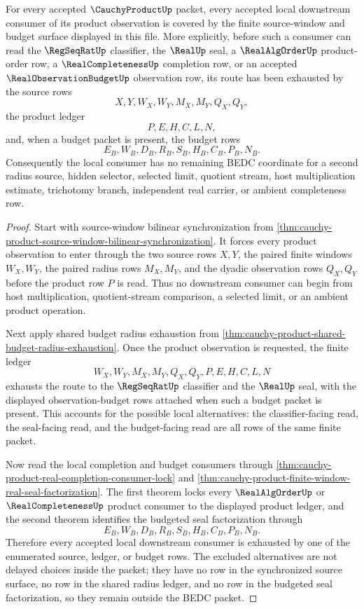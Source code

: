 \begin{theorem}
\label{thm:cauchy-product-source-window-downstream-coverage}
For every accepted $\CauchyProductUp$ packet, every accepted local downstream consumer of its product observation is covered by the finite source-window and budget surface displayed in this file. More explicitly, before such a consumer can read the $\RegSeqRatUp$ classifier, the $\RealUp$ seal, a $\RealAlgOrderUp$ product-order row, a $\RealCompletenessUp$ completion row, or an accepted $\RealObservationBudgetUp$ observation row, its route has been exhausted by the source rows
$$
X,Y,W_X,W_Y,M_X,M_Y,Q_X,Q_Y,
$$
the product ledger
$$
P,E,H,C,L,N,
$$
and, when a budget packet is present, the budget rows
$$
E_B,W_B,D_B,R_B,S_B,H_B,C_B,P_B,N_B.
$$
Consequently the local consumer has no remaining BEDC coordinate for a second radius source, hidden selector, selected limit, quotient stream, host multiplication estimate, trichotomy branch, independent real carrier, or ambient completeness row.
\end{theorem}
\begin{proof}
Start with source-window bilinear synchronization from \autoref{thm:cauchy-product-source-window-bilinear-synchronization}. It forces every product observation to enter through the two source rows $X,Y$, the paired finite windows $W_X,W_Y$, the paired radius rows $M_X,M_Y$, and the dyadic observation rows $Q_X,Q_Y$ before the product row $P$ is read. Thus no downstream consumer can begin from host multiplication, quotient-stream comparison, a selected limit, or an ambient product operation.

Next apply shared budget radius exhaustion from \autoref{thm:cauchy-product-shared-budget-radius-exhaustion}. Once the product observation is requested, the finite ledger
$$
W_X,W_Y,M_X,M_Y,Q_X,Q_Y,P,E,H,C,L,N
$$
exhausts the route to the $\RegSeqRatUp$ classifier and the $\RealUp$ seal, with the displayed observation-budget rows attached when such a budget packet is present. This accounts for the possible local alternatives: the classifier-facing read, the seal-facing read, and the budget-facing read are all rows of the same finite packet.

Now read the local completion and budget consumers through \autoref{thm:cauchy-product-real-completion-consumer-lock} and \autoref{thm:cauchy-product-finite-window-real-seal-factorization}. The first theorem locks every $\RealAlgOrderUp$ or $\RealCompletenessUp$ product consumer to the displayed product ledger, and the second theorem identifies the budgeted seal factorization through
$$
E_B,W_B,D_B,R_B,S_B,H_B,C_B,P_B,N_B.
$$
Therefore every accepted local downstream consumer is exhausted by one of the enumerated source, ledger, or budget rows. The excluded alternatives are not delayed choices inside the packet; they have no row in the synchronized source surface, no row in the shared radius ledger, and no row in the budgeted seal factorization, so they remain outside the BEDC packet.
\end{proof}
